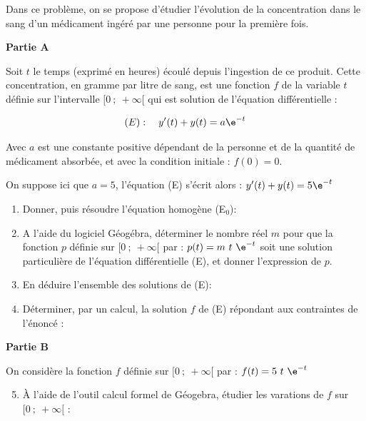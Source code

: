 \begin{exercice_cours}[\quad]{}

	Dans ce problème, on se propose d’étudier l’évolution de la concentration dans le sang d’un médicament ingéré par une personne pour la première fois.

	\medskip

{\bf Partie A}\par     

Soit $t$ le temps (exprimé en heures) écoulé depuis l’ingestion de ce produit. Cette concentration, en gramme par litre de sang, est une fonction $f$ de la variable $t$ définie sur l’intervalle $[0~;~+\infty[$ qui est solution de l’équation différentielle :

\[(E) : \quad y'(t)+y(t)= a\e^{-t} \]

Avec $a$ est une constante positive dépendant de la personne et de la quantité de médicament absorbée, et avec la condition initiale : $f (0) = 0$.

On suppose ici que $a = 5$, l’équation (E) s’écrit alors : $y'(t)+y(t)= 5\e^{-t}$

\begin{enumerate}
	\item Donner, puis résoudre l'équation homogène (E$_0$): 
	
	\hfill\reponseLigne[0.95\linewidth]{}   	    
	\item A l’aide du logiciel Géogébra, déterminer le nombre réel $m$ pour que la fonction $p$ définie sur $[0~;~+\infty[$ par : $p(t) = m~t~\e^{-t}$ soit une solution particulière de l'équation différentielle (E), et donner l’expression de $p$. 	\hfill\reponseLigne[7cm]{}
	\item En déduire l'ensemble des solutions de (E):     \hfill\reponseLigne[7cm]{}
	\item Déterminer, par un calcul, la solution $f$ de (E) répondant aux contraintes de l'énoncé :     
\begin{blocvisiblex}[height=2]
{\quad}
\end{blocvisiblex}
\end{enumerate}

\pagebreak

{\bf Partie B}\par     

On considère la fonction $f$ définie sur $[0~;~+\infty[$ par : $f(t)=5~t~\e^{-t}$

\begin{enumerate}
	\setcounter{enumi}{4}
	\item À l'aide de l'outil calcul formel de Géogebra, étudier les varations de $f$ sur $[0~;~+\infty[$ :
	

\end{enumerate}
\end{exercice_cours}
